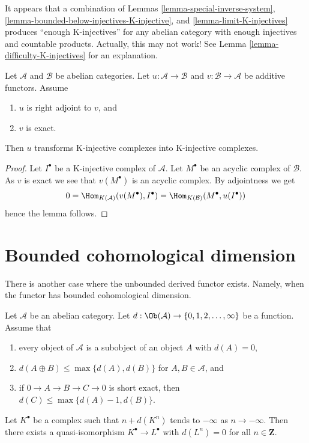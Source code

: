 \noindent
It appears that a combination of Lemmas \ref{lemma-special-inverse-system},
\ref{lemma-bounded-below-injectives-K-injective}, and
\ref{lemma-limit-K-injectives} produces ``enough K-injectives'' for any
abelian category with enough injectives and countable products.
Actually, this may not work! See Lemma \ref{lemma-difficulty-K-injectives}
for an explanation.

\begin{lemma}
\label{lemma-adjoint-preserve-K-injectives}
Let $\mathcal{A}$ and $\mathcal{B}$ be abelian categories.
Let $u : \mathcal{A} \to \mathcal{B}$ and
$v : \mathcal{B} \to \mathcal{A}$ be additive functors. Assume
\begin{enumerate}
\item $u$ is right adjoint to $v$, and
\item $v$ is exact.
\end{enumerate}
Then $u$ transforms K-injective complexes into K-injective complexes.
\end{lemma}

\begin{proof}
Let $I^\bullet$ be a K-injective complex of $\mathcal{A}$.
Let $M^\bullet$ be an acyclic complex of $\mathcal{B}$.
As $v$ is exact we see that $v(M^\bullet)$ is an acyclic complex.
By adjointness we get
$$
0 = \Hom_{K(\mathcal{A})}(v(M^\bullet), I^\bullet) =
\Hom_{K(\mathcal{B})}(M^\bullet, u(I^\bullet))
$$
hence the lemma follows.
\end{proof}





\section{Bounded cohomological dimension}
\label{section-bounded}

\noindent
There is another case where the unbounded derived functor exists.
Namely, when the functor has bounded cohomological dimension.

\begin{lemma}
\label{lemma-replace-resolution}
Let $\mathcal{A}$ be an abelian category. Let
$d : \Ob(\mathcal{A}) \to \{0, 1, 2, \ldots, \infty\}$ be a function.
Assume that
\begin{enumerate}
\item every object of $\mathcal{A}$ is a subobject of an
object $A$ with $d(A) = 0$,
\item $d(A \oplus B) \leq \max \{d(A), d(B)\}$ for $A, B \in \mathcal{A}$, and
\item if $0 \to A \to B \to C \to 0$ is short exact, then
$d(C) \leq \max\{d(A) - 1, d(B)\}$.
\end{enumerate}
Let $K^\bullet$ be a complex such that $n + d(K^n)$ tends to $-\infty$
as $n \to -\infty$. Then there exists a quasi-isomorphism
$K^\bullet \to L^\bullet$ with $d(L^n) = 0$ for all $n \in \mathbf{Z}$.
\end{lemma}

